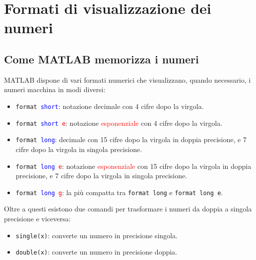 \chapter{Formati di visualizzazione dei numeri}
\section{Come MATLAB memorizza i numeri}
MATLAB dispone di vari formati numerici che visualizzano, quando necessario, i numeri macchina in modi diversi:
\begin{itemize}

	\item	\texttt{format \textcolor{blue}{short}}: notazione decimale con 4 cifre dopo la virgola.
	
	\item	\texttt{format \textcolor{blue}{short} \textcolor{red}{e}}: notazione \textcolor{red}{esponenziale} 
			con 4 cifre dopo la virgola.
			
	\item	\texttt{format \textcolor{blue}{long}}: decimale con 15 cifre dopo la virgola in doppia precisione, e 
			7 cifre dopo la virgola in singola precisione.
			
	\item	\texttt{format \textcolor{blue}{long} \textcolor{red}{e}}: notazione \textcolor{red}{esponenziale} 
			con 15 cifre dopo la virgola in doppia precisione, e 7 cifre dopo la virgola in singola precisione.
			
	\item	\texttt{format \textcolor{blue}{long} \textcolor{red}{g}}: la più compatta tra \texttt{format long} e 
			\texttt{format long e}.

\end{itemize}

Oltre a questi esistono due comandi per trasformare i numeri da doppia a singola precisione e viceversa:
\begin{itemize}

	\item	\texttt{single(x)}: converte un numero in precisione singola.
	
	\item 	\texttt{double(x)}: converte un numero in precisione doppia.

\end{itemize}